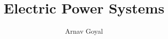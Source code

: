 

\title{Electric Power Systems}
\author{Arnav Goyal}

\def\myreferences{
	\item Provided Course Materials \& Lecture Notes
}


	
	\frontmatter
	\maketitle
	\preface
	
	\mainmatter
	
	
	
